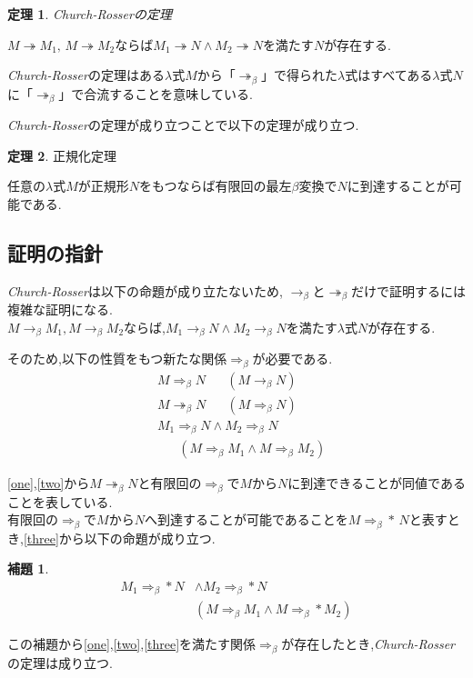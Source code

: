 \documentclass[a4j,10pt]{jsarticle}
\theoremstyle{definition}
\newtheorem{theorem}{定理}
\newtheorem*{lemma*}{補題}
\newcommand{\betah}{\longrightarrow_\beta }
\newcommand{\pbetah}{\Longrightarrow_\beta }
\begin{document}
\begin{theorem}
{\sl Church-Rosserの定理}\par
$M \twoheadrightarrow M_1,\, M \twoheadrightarrow M_2 \mbox{ならば} M_1 \twoheadrightarrow N \land M_2 \twoheadrightarrow N$を満たす$N$が存在する.
\end{theorem}
{\sl Church-Rosser}の定理はある\(\lambda\)式$M$から「$\twoheadrightarrow_\beta$」で得られた\(\lambda\)式はすべてある\(\lambda\)式$N$に「$\twoheadrightarrow_\beta$」で合流することを意味している.\par
{\sl Church-Rosser}の定理が成り立つことで以下の定理が成り立つ.
\begin{theorem}
正規化定理\par
任意の\(\lambda\)式$M$が正規形$N$をもつならば有限回の最左$\beta$変換で$N$に到達することが可能である.
\end{theorem}

\subsection*{証明の指針}
{\sl Church-Rosser}は以下の命題が成り立たないため, \(\betah\)と\(\twoheadrightarrow_\beta\)だけで証明するには複雑な証明になる.\vspace{7pt}\\
\(M \betah M_1, M \betah M_2\)ならば,\(M_1 \betah N \land M_2 \betah N\)を満たす\(\lambda\)式\(N\)が存在する.\vspace{7pt}\par
そのため,以下の性質をもつ新たな関係\(\pbetah\)が必要である.
\begin{align}
& M \pbetah N \hspace{20pt}(M \betah N) \label{one} \\
& M \twoheadrightarrow_\beta N \hspace{20pt} (M \pbetah N)\label{two} \\
& M_1 \pbetah N \land M_2 \pbetah N\\ 
    &  \hspace{20pt} (M \pbetah M_1 \land M \pbetah M_2)\label{three}
\end{align}

\eqref{one},\eqref{two}から\(M \twoheadrightarrow_\beta N\)と有限回の\(\pbetah\)で\(M\)から\(N\)に到達できることが同値であることを表している.\\
有限回の\(\pbetah\)で\(M\)から\(N\)へ到達することが可能であることを\(M \Longrightarrow_\beta\ast\, N\)と表すとき,\eqref{three}から以下の命題が成り立つ.
\begin{lemma*}
\begin{align}
 M_1 \Longrightarrow_\beta\ast N &\land M_2 \Longrightarrow_\beta\ast N \\
 &(M \pbetah M_1 \land M \Longrightarrow_\beta\ast M_2)\label{ho}
\end{align}
\end{lemma*}
この補題から\eqref{one},\eqref{two},\eqref{three}を満たす関係\(\pbetah\)が存在したとき,{\sl Church-Rosser}の定理は成り立つ.
\end{document}
